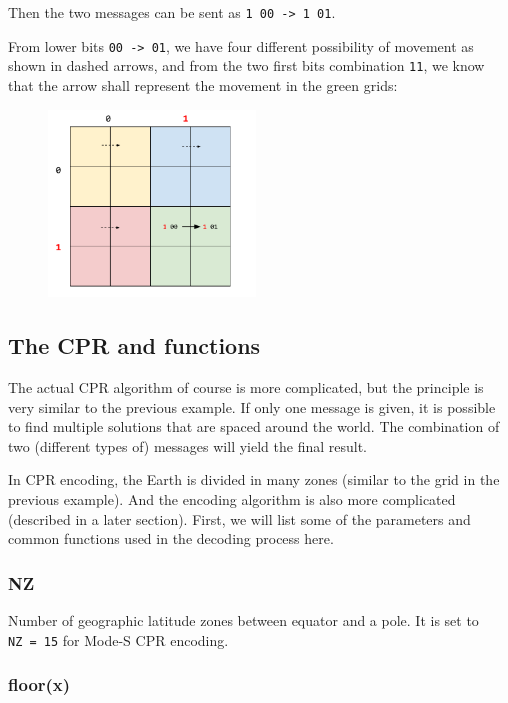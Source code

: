 Then the two messages can be sent as \texttt{1\ 00\ -\textgreater{}\ 1\ 01}.

From lower bits \texttt{00\ -\textgreater{}\ 01}, we have four different possibility of movement as shown in dashed arrows, and from the two first bits combination \texttt{11}, we know that the arrow shall represent the movement in the green grids:

\begin{figure}
  \center
  \includegraphics[width=5.5cm]{images/illustration-cpr-2.pdf}
\end{figure}

\subsection{The CPR and functions}\label{the-cpr-and-functions}

The actual CPR algorithm of course is more complicated, but the principle is very similar to the previous example. If only one message is given, it is possible to find multiple solutions that are spaced around the world. The combination of two (different types of) messages will yield the final result.

In CPR encoding, the Earth is divided in many zones (similar to the grid in the previous example). And the encoding algorithm is also more complicated (described in a later section). First, we will list some of the parameters and common functions used in the decoding process here.

\subsubsection{NZ}\label{nz}

Number of geographic latitude zones between equator and a pole. It is set to \texttt{NZ\ =\ 15} for Mode-S CPR encoding.

\subsubsection{floor(x)}\label{floorx}

